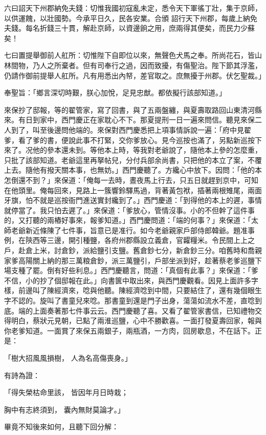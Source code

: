 \begin{showcontents}{}
六曰詔天下州郡納免夫錢：切惟我國初寇亂未定，悉令天下軍徭丁壯，集于京師，以供運餽，以壯國勢。今承平日久，民各安業。合頒  詔行天下州郡，每歲上納免夫錢。每名折錢三十貫，解赴京師，以資邊餉之用，庶兩得其便矣，而民力少蘇矣！

七曰置提舉御前人舡所：切惟陛下自即位以來，無聲色犬馬之奉。所尚花石，皆山林間物，乃人之所棄者。但有司奉行之過，因而致擾，有傷聖治。陛下節其浮濫，仍請作御前提舉人舡所。凡有用悉出內帑，差官取之。庶無擾于州郡。伏乞聖裁。」

奉聖旨：「鄉言深切時艱，朕心加悅，足見忠猷。都依擬行該部知道。」

來保抄了邸報，等的翟管家，寫了回書，與了五兩盤纏，與夏壽取路回山東清河縣來。有日到家中，西門慶正在家耽心不下。那夏提刑一日一遍來問信。聽見來保二人到了，叫至後邊問他端的。來保對西門慶悉把上項事情訴說一遍：「府中見翟爹，看了爹的書，便說此事不打緊，交你爹放心。見今巡按也滿了，另點新巡按下來了。况他的參本還未到。等他本上時，等我對老爺說了，隨他本上參的怎麼重，只批了該部知道。老爺這里再拏帖兒，分付兵部余尚書，只把他的本立了案，不覆上去。隨他有撥天關本事，也無妨。」西門慶聽了。方纔心中放下。因問：「他的本怎倒還不到？」來保道：「俺每一去時，晝夜馬上行去，只五日就趕到京中，可知在他頭里。俺每回來，見路上一簇響鈴驛馬過，背著黃包袱，插著兩根雉尾，兩面牙旗，怕不就是巡按衙門進送實封纔到了。」西門慶道：「到得他的本上的遲，事情就停當了。我只怕去遲了。」來保道：「爹放心，管情沒事。小的不但幹了這件事的，又打聽的兩樁好事來，報爹知道。」西門慶問道：「端的何事？」來保道：「太師老爺新近條陳了七件事，旨意已是准行。如今老爺親家戶部侍郎韓爺。題准事例，在陝西等三邊，開引種鹽，各府州郡縣設立義倉，官糶糧米。令民間上上之戶，赴倉上米，討倉鈔，派給鹽引支鹽。舊倉鈔七分，新倉鈔三分。咱舊時和喬親家爹高陽關上納的那三萬粮倉鈔，派三萬鹽引，戶部坐派到好，趁著蔡老爹巡鹽下場支種了罷。倒有好些利息。」西門慶聽言，問道：「真個有此事？」來保道：「爹不信，小的抄了個邸報在此。」向書篋中取出來，與西門慶觀看。因見上面許多字樣，前邊叫了陳經濟來，唸與他聽。陳經濟唸到中間，只要結住了，還有幾個眼生字不認的。旋叫了書童兒來唸。那書童到還是門子出身，蕩蕩如流水不差，直唸到底。端的上面奏著那七件事云云。西門慶聽了喜。又看了翟管家書信，已知禮物交得明白，蔡狀元見朝，已點了兩淮巡鹽，心中不勝歡喜。一面打發夏壽回家，報與你老爹知道。一面賞了來保五兩銀子，兩瓶酒，一方肉，回房歇息，不在話下。正是：

「樹大招風風損樹，  人為名高傷喪身。」

有詩為證：

「得失榮枯命里該，  皆因年月日時栽；

胸中有志終須到，  囊內無財莫論才。」

畢竟不知後來如何，且聽下回分解：




\end{showcontents}


